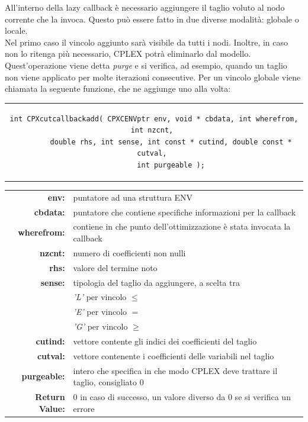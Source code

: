 All'interno della lazy callback è necessario aggiungere il taglio voluto al nodo corrente che la invoca. Questo può essere fatto in due diverse modalità: globale o locale.\\
Nel primo caso il vincolo aggiunto sarà visibile da tutti i nodi. Inoltre, in caso non lo ritenga più necessario, CPLEX potrà eliminarlo dal modello. Quest'operazione viene detta \textit{purge} e si verifica, ad esempio, quando un taglio non viene applicato per molte iterazioni consecutive. Per un vincolo globale viene chiamata la seguente funzione, che ne aggiunge uno alla volta:
\begin{center}
\begin{tabular}{c}
\begin{lstlisting}[linewidth=400pt, basicstyle=\footnotesize\sffamily,]  
int CPXcutcallbackadd( CPXCENVptr env, void * cbdata, int wherefrom, int nzcnt, 
		double rhs, int sense, int const * cutind, double const * cutval, 
		int purgeable );
\end{lstlisting}
\end{tabular}
\end{center}
\begin{table}[H]
\centering
\begin{tabular}{rl}
\textbf{env:} & {puntatore ad una struttura ENV}\\
\textbf{cbdata:} & {puntatore che contiene specifiche informazioni per la callback}\\
\textbf{wherefrom:} & {contiene in che punto dell'ottimizzazione è stata invocata la callback} \\ 
\textbf{nzcnt:} & {numero di coefficienti non nulli} \\
\textbf{rhs:} & {valore del termine noto} \\
\textbf{sense:} & {tipologia del taglio da aggiungere, a scelta tra} \\
&{\textit{'L'} per vincolo $\leq$}\\
&{\textit{'E'} per vincolo $=$}\\
&{\textit{'G'} per vincolo $\geq$}\\
\textbf{cutind:} & {vettore contente gli indici dei coefficienti del taglio} \\
\textbf{cutval:} & {vettore contenente i coefficienti delle variabili nel taglio} \\
\textbf{purgeable:} & {intero che specifica in che modo CPLEX deve trattare il taglio, consigliato 0} \\
\textbf{Return Value:} & {0 in caso di successo, un valore diverso da 0 se si verifica un errore}\\  
\end{tabular}
\end{table}
